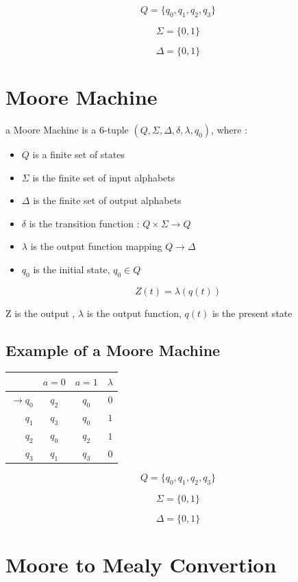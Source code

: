 \documentclass[12pt]{book}
\begin{document}
$$
Q = \{ q_{0}, q_{1}, q_{2}, q_{3} \}
$$

$$
\Sigma = \{ 0, 1 \}
$$

$$
\Delta = \{ 0, 1 \}
$$



\section{Moore Machine}

a Moore Machine is a 6-tuple $(Q, \Sigma, \Delta, \delta, \lambda, q_{0})$, where :

\begin{itemize}
	\item $Q$ is a finite set of states
	\item $\Sigma$ is the finite set of input alphabets
	\item $\Delta$ is the finite set of output alphabets
	\item $\delta$ is the transition function : $Q \times \Sigma \to Q$
	\item $\lambda$ is the output function mapping $Q \to \Delta$
	\item $q_{0}$ is the initial state, $q_{0} \in Q$
\end{itemize}

$$
Z(t) = \lambda( q(t) )
$$

Z is the output , $\lambda$ is the output function, $q(t)$ is the present state

\subsection{Example of a Moore Machine}

\begin{tabular}{r | c c c  } 
     & $a=0$ & $a=1$ & $\lambda$ \\
\hline
$\to q_{0}$ & $q_{2}$ & $q_{0}$ & $0$   \\
$q_{1}$ & $q_{3}$ & $q_{0}$ & $1$   \\
$q_{2}$ & $q_{0}$ & $q_{2}$ & $1$   \\
$q_{3}$ & $q_{1}$ & $q_{3}$ & $0$   \\
\end{tabular}


$$
Q = \{ q_{0}, q_{1}, q_{2}, q_{3} \}
$$


$$
\Sigma = \{ 0, 1 \}
$$

$$
\Delta = \{ 0, 1 \}
$$


\section{Moore to Mealy Convertion}
\end{document}
